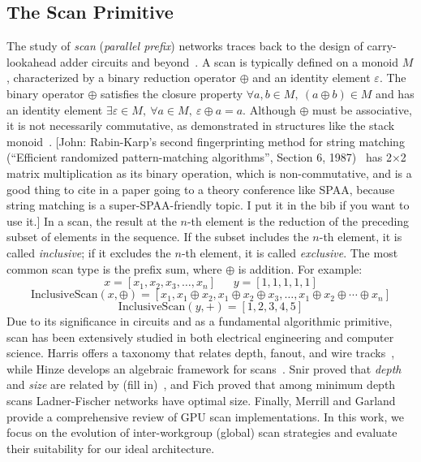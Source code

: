 \documentclass[sigconf]{acmart}
\newcommand{\john}[1]{{\footnotesize\color{cyan}[John: #1]}}
\begin{document}
\subsection{The Scan Primitive}
The study of \emph{scan} (\emph{parallel prefix}) networks traces back to the design of carry-lookahead adder circuits and beyond~\cite{10.1145/322217.322232, 5219801}. A scan is typically defined on a monoid \( M \), characterized by a binary reduction operator \( \oplus \) and an identity element \( \varepsilon \). The binary operator \( \oplus \) satisfies the closure property \( \forall a, b \in M, \ (a \oplus b) \in M \) and has an identity element \( \exists \varepsilon \in M, \ \forall a \in M, \ \varepsilon \oplus a = a \). Although \( \oplus \) must be associative, it is not necessarily commutative, as demonstrated in structures like the stack monoid~\cite{}. \john{Rabin-Karp's second fingerprinting method for string matching (``Efficient randomized pattern-matching algorithms'', Section 6, 1987)~\cite[Section 6]{Karp:1987:ERP} has 2$\times$2 matrix multiplication as its binary operation, which is non-commutative, and is a good thing to cite in a paper going to a theory conference like SPAA, because string matching is a super-SPAA-friendly topic. I put it in the bib if you want to use it.} In a scan, the result at the \( n \)-th element is the reduction of the preceding subset of elements in the sequence. If the subset includes the \( n \)-th element, it is called \emph{inclusive}; if it excludes the \( n \)-th element, it is called \emph{exclusive}. The most common scan type is the prefix sum, where \( \oplus \) is addition. For example:
\[
  x = [x_1, x_2, x_3, \dots, x_n] \ \ \ \ \ \ \ y = [1, 1, 1, 1, 1]
\]
\[
  \text{InclusiveScan}(x, \oplus) = [x_1, x_1 \oplus x_2, x_1 \oplus x_2 \oplus x_3, \dots, x_1 \oplus x_2 \oplus \cdots \oplus x_n]
\]
\[
  \text{InclusiveScan}(y, +) = [1, 2, 3, 4, 5]
\]
Due to its significance in circuits and as a fundamental algorithmic primitive, scan has been extensively studied in both electrical engineering and computer science. Harris offers a taxonomy that relates depth, fanout, and wire tracks~\cite{}, while Hinze develops an algebraic framework for scans~\cite{}. Snir proved that \emph{depth} and \emph{size} are related by (fill in)~\cite{}, and Fich proved that among minimum depth scans Ladner-Fischer networks have optimal size. Finally, Merrill and Garland provide a comprehensive review of GPU scan implementations. In this work, we focus on the evolution of inter-workgroup (global) scan strategies and evaluate their suitability for our ideal architecture.
\end{document}
